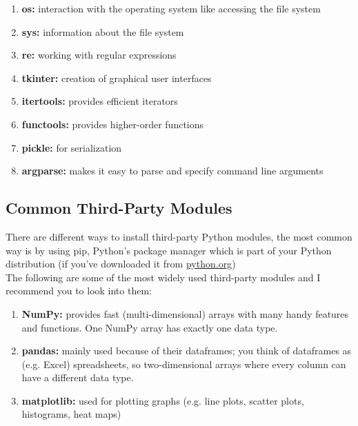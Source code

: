         \begin{enumerate}
            \item \textbf{os:} interaction with the operating system like accessing the file system
            \item \textbf{sys:} information about the file system
            \item \textbf{re:} working with regular expressions
            \item \textbf{tkinter:} creation of graphical user interfaces
            \item \textbf{itertools:} provides efficient iterators
            \item \textbf{functools:} provides higher-order functions
            \item \textbf{pickle:} for serialization
            \item \textbf{argparse:} makes it easy to parse and specify command line arguments
        \end{enumerate}
    
    \subsection{Common Third-Party Modules}
        There are different ways to install third-party Python modules, the most common way is by using pip, Python's package manager which is part of your Python distribution (if you've downloaded it from \href{https://python.org}{python.org})\\
        The following are some of the most widely used third-party modules and I recommend you to look into them:
        \begin{enumerate}
            \item \textbf{NumPy:} provides fast (multi-dimensional) arrays with many handy features and functions. One NumPy array has exactly one data type.
            \item \textbf{pandas:} mainly used because of their dataframes; you think of dataframes as (e.g. Excel) spreadsheets, so two-dimensional arrays where every column can have a different data type.
            \item \textbf{matplotlib:} used for plotting graphs (e.g. line plots, scatter plots, histograms, heat maps)
        \end{enumerate}
    
